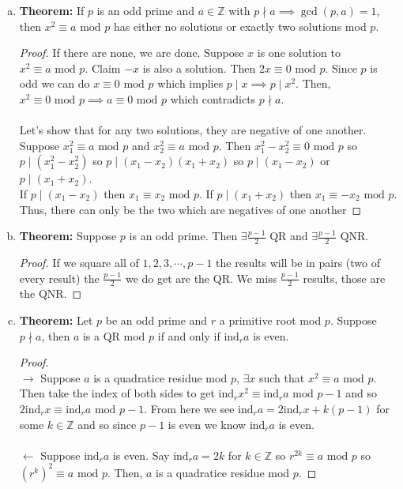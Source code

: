 \documentclass[class=article, crop=false]{standalone}
\def\integers{{\mathbb Z}}
\def\ind{{\text{ind}}}
\begin{document}
\begin{enumerate}[1.]
\begin{enumerate}[(a)]
	\item \textbf{Theorem:} If $p$ is an odd prime and $a\in\integers$ with $p\nmid a \implies \gcd(p,a)=1$,
	then $x^2\equiv a\mbox{ mod } p$ has either no solutions or exactly two solutions mod $p$.
	\begin{proof}
		If there are none, we are done. Suppose $x$ is one solution to $x^2\equiv a\mbox{ mod }p$.
		Claim $-x$ is also a solution. Then $2x\equiv 0\mbox{ mod }p$.
		Since $p$ is odd we can do $x\equiv 0\mbox{ mod }p$ which implies $p\mid x\implies p\mid x^2$.
		Then, $x^2\equiv 0\mbox{ mod }p \implies a\equiv 0 \mbox{ mod }p$ which contradicts $p\nmid a$.\\\\
		Let's show that for any two solutions, they are negative of one another.
		Suppose $x_1^2 \equiv a\mbox{ mod }p$ and $x_2^2 \equiv a\mbox{ mod }p$.
		Then $x_1^2 - x_2^2 \equiv 0\mbox{ mod }p$ so $p\mid (x_1^2 - x_2^2)$ so
		$p\mid (x_1 - x_2) (x_1 + x_2)$ so $p\mid (x_1- x_2)$ or $p\mid (x_1 + x_2)$.\\
		If $p\mid (x_1 -x_2)$ then $x_1 \equiv x_2 \mbox{ mod }p$.
		If $p\mid (x_1 +x_2)$ then $x_1 \equiv -x_2 \mbox{ mod }p$.
		Thus, there can only be the two which are negatives of one another
	\end{proof}
	
	\item \textbf{Theorem:} Suppose $p$ is an odd prime. Then $\exists \frac{p-1}{2}$ QR and
	$\exists \frac{p-1}{2}$ QNR.
	\begin{proof}
		If we square all of $1,2,3,\cdots, p-1$ the results will be in pairs (two of every result)
		the $\frac{p-1}{2}$ we do get are the QR.
		We miss $\frac{p-1}{2}$ results, those are the QNR.
	\end{proof}

	\item \textbf{Theorem:} Let $p$ be an odd prime and $r$ a primitive root mod $p$.
	Suppose $p\nmid a$, then $a$ is a QR mod $p$ if and only if $\ind_r a$ is even.
	\begin{proof}
		$ $\\
		$\rightarrow$ Suppose $a$ is a quadratice residue mod $p$, $\exists x$ such that $x^2 \equiv a\mbox{ mod }p$.
		Then take the index of both sides to get $\ind_r x^2 \equiv \ind_r a\mbox{ mod }p-1$ and so
		$2\ind_r x \equiv \ind_r a\mbox{ mod }p-1$. From here we see $\ind_r a = 2\ind_r x + k(p-1)$ for some
		$k\in\integers$ and so since $p-1$ is even we know $\ind_r a$ is even. \\\\
		$\leftarrow$ Suppose $\ind_r a$ is even. Say $\ind_r a = 2k$ for $k\in\integers$ 
		so $r^{2k} \equiv a \mbox{ mod }p$ so $(r^k)^2\equiv a\mbox{ mod }p$. 
		Then, $a$ is a quadratice residue mod $p$.
	\end{proof}


\end{enumerate}
\end{enumerate}
\end{document}
